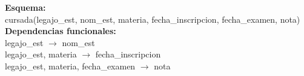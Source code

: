\documentclass[preview]{standalone}
\begin{document}
\textbf{Esquema:}\\
cursada(legajo\_est, nom\_est, materia, fecha\_inscripcion, fecha\_examen, nota)\\

\textbf{Dependencias funcionales:}\\
legajo\_est $\rightarrow$ nom\_est\\
legajo\_est, materia $\rightarrow$ fecha\_inscripcion\\
legajo\_est, materia, fecha\_examen $\rightarrow$ nota\\
\end{document}

